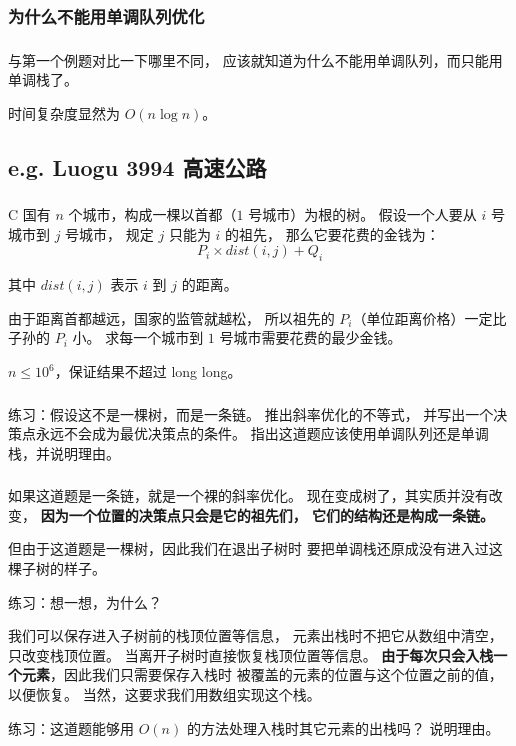 \documentclass[9pt, UTF8]{beamer} %
\newcommand \fts {\frametitle{\insertsubsection}}
\newcommand \ftss {\frametitle{\insertsubsubsection}}
\newcommand \bpause { \bigskip \pause }
\begin{document}
	\subsubsection{为什么不能用单调队列优化}

	\begin{frame}
		\ftss

		与第一个例题对比一下哪里不同，
		应该就知道为什么不能用单调队列，而只能用单调栈了。

		时间复杂度显然为 $O(n \log n)$。
	\end{frame}

	\subsection {e.g. Luogu 3994 高速公路}

	\begin{frame}
		\fts

		C 国有 $n$ 个城市，构成一棵以首都（$1$ 号城市）为根的树。
		假设一个人要从 $i$ 号城市到 $j$ 号城市，
		规定 $j$ 只能为 $i$ 的祖先，
		那么它要花费的金钱为：
		$$
		P_i \times dist(i, j) + Q_i
		$$

		其中 $dist(i, j)$ 表示 $i$ 到 $j$ 的距离。

		由于距离首都越远，国家的监管就越松，
		所以祖先的 $P_i$（单位距离价格）一定比子孙的 $P_i$ 小。
		求每一个城市到 $1$ 号城市需要花费的最少金钱。

		\bigskip

		$n \le 10^6$，保证结果不超过 long long。
	\end{frame}

	\begin{frame}
		\fts

		练习：假设这不是一棵树，而是一条链。
		推出斜率优化的不等式，
		并写出一个决策点永远不会成为最优决策点的条件。
		指出这道题应该使用单调队列还是单调栈，并说明理由。
	\end{frame}

	\begin{frame}
		\fts

		如果这道题是一条链，就是一个裸的斜率优化。
		现在变成树了，其实质并没有改变，
		\textbf{因为一个位置的决策点只会是它的祖先们，
		它们的结构还是构成一条链。}

		\bpause

		但由于这道题是一棵树，因此我们在退出子树时
		要把单调栈还原成没有进入过这棵子树的样子。

		练习：想一想，为什么？

		\bpause

		我们可以保存进入子树前的栈顶位置等信息，
		元素出栈时不把它从数组中清空，只改变栈顶位置。
		当离开子树时直接恢复栈顶位置等信息。
		\textbf{由于每次只会入栈一个元素}，因此我们只需要保存入栈时
		被覆盖的元素的位置与这个位置之前的值，以便恢复。
		当然，这要求我们用数组实现这个栈。

		练习：这道题能够用 $O(n)$ 的方法处理入栈时其它元素的出栈吗？
		说明理由。
	\end{frame}
\end{document}
